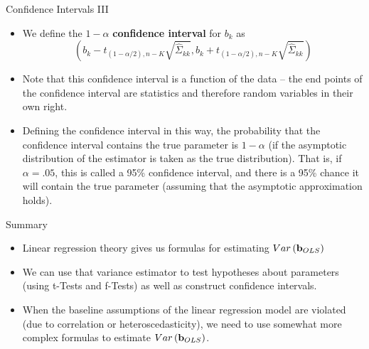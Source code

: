 \begin{frame}{Confidence Intervals III}
\begin{itemize}
	\item We define the $1-\alpha$ {\bf confidence interval} for $b_{k}$ as \[
	\left(b_{k} - t_{\left(1-\alpha/2\right),n-K} \sqrt{\hat{\Sigma}_{kk}} , b_k +  t_{\left(1-\alpha/2\right),n-K}  \sqrt{\hat{\Sigma}_{kk}} \right)
	\]

	\smallskip
	\item Note that this confidence interval is a function of the data -- the end points of the confidence interval 
	are statistics and therefore random variables in their own right. 

	\smallskip
	\item Defining the confidence interval in this way, the probability that the confidence interval contains
	the true parameter is $1-\alpha$ (if the asymptotic distribution of the estimator is taken as the true distribution). 
	That is, if $\alpha=.05$, this is called a 95\% confidence interval, and there
	is a 95\% chance it will contain the true parameter (assuming that the asymptotic approximation holds). 

\end{itemize}
\end{frame}

\begin{frame}{Summary}
\begin{itemize}
	\item Linear regression theory gives us formulas for estimating $Var\left({\bf b}_{OLS}\right)$

	\item We can use that variance estimator to test hypotheses about parameters (using t-Tests
	and f-Tests) as well as construct confidence intervals. 

	\item When the baseline assumptions of the linear regression model are violated (due to
	correlation or heteroscedasticity), we need to use somewhat more complex formulas
	to estimate  $Var\left({\bf b}_{OLS}\right)$.

\end{itemize}
\end{frame}



